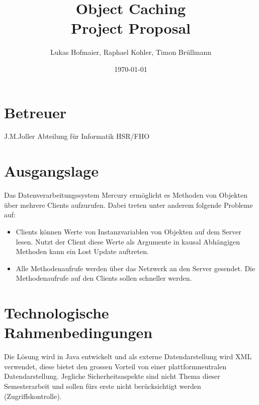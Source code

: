 \documentclass{article}
\title{Object Caching\\Project Proposal}
\author{Lukas Hofmaier, Raphael Kohler, Timon Brüllmann}
\date{\today}
\begin{document}
\maketitle
\section{Betreuer}
J.M.Joller  Abteilung für Informatik HSR/FHO

\section{Ausgangslage}
Das Datenverarbeitungssystem Mercury ermöglicht es Methoden von Objekten über mehrere Clients aufzurufen. Dabei treten unter anderem folgende Probleme auf:

\begin{itemize}
\item Clients können Werte von Instanzvariablen von Objekten auf dem Server lesen. Nutzt der Client diese Werte als Argumente in kausal Abhängigen Methoden kann ein Lost Update auftreten.
\item Alle Methodenaufrufe werden über das Netzwerk an den Server gesendet. Die Methodenaufrufe auf den Clients sollen schneller werden.
\end{itemize}


\section{Technologische Rahmenbedingungen}
Die Lösung wird in Java entwickelt und als externe Datendarstellung wird XML verwendet, diese bietet den grossen Vorteil von einer plattformneutralen Datendarstellung. Jegliche Sicherheitsaspekte sind nicht Thema dieser Semesterarbeit und sollen fürs erste nicht berücksichtigt werden (Zugriffskontrolle).
\end{document}
